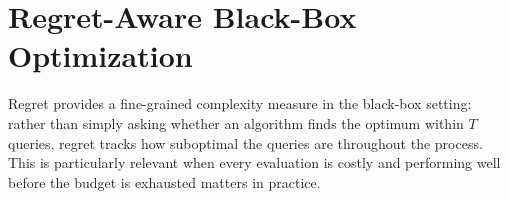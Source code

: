 



\section{Regret-Aware Black-Box Optimization}
\label{sec:regret-bbo}

Regret provides a fine-grained complexity measure in the black-box
setting: rather than
simply asking whether an algorithm finds the optimum within $T$
queries, regret tracks
how suboptimal the queries are throughout the process. This is
particularly relevant
when every evaluation is costly and performing well before the budget
is exhausted
matters in practice.

